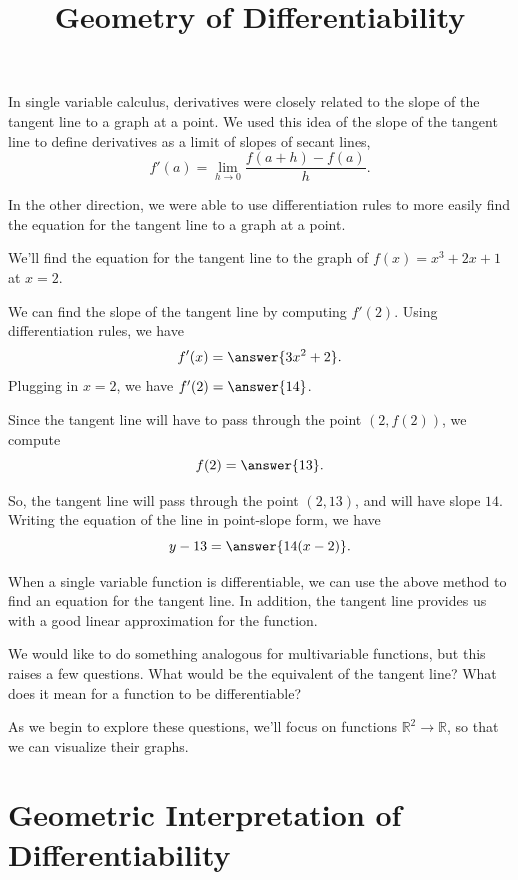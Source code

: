 \documentclass{ximera}
\title{Geometry of Differentiability}
\begin{document}
\begin{abstract}
\end{abstract}
\maketitle

In single variable calculus, derivatives were closely related to the slope of the tangent line to a graph at a point. We used this idea of the slope of the tangent line to define derivatives as a limit of slopes of secant lines,
\[
f'(a) = \lim_{h\rightarrow 0}\frac{f(a+h)-f(a)}{h}.
\]


In the other direction, we were able to use differentiation rules to more easily find the equation for the tangent line to a graph at a point.

\begin{example}
We'll find the equation for the tangent line to the graph of $f(x)=x^3+2x+1$ at $x=2$.

We can find the slope of the tangent line by computing $f'(2)$. Using differentiation rules, we have
\[
f'(x) = \answer{3x^2+2}.
\]
Plugging in $x=2$, we have $f'(2) = \answer{14}$.

Since the tangent line will have to pass through the point $(2,f(2))$, we compute
\[
f(2) = \answer{13}.
\]

So, the tangent line will pass through the point $(2,13)$, and will have slope $14$. Writing the equation of the line in point-slope form, we have
\[
y-13 = \answer{14(x-2)}.
\]
\end{example}

When a single variable function is differentiable, we can use the above method to find an equation for the tangent line. In addition, the tangent line provides us with a good linear approximation for the function.

We would like to do something analogous for multivariable functions, but this raises a few questions. What would be the equivalent of the tangent line? What does it mean for a function to be differentiable?

As we begin to explore these questions, we'll focus on functions $\mathbb{R}^2\rightarrow\mathbb{R}$, so that we can visualize their graphs.

\section*{Geometric Interpretation of Differentiability}
\end{document}
